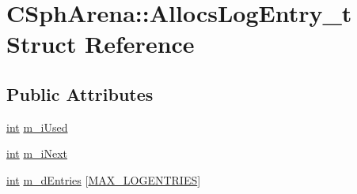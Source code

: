 \hypertarget{structCSphArena_1_1AllocsLogEntry__t}{\section{C\-Sph\-Arena\-:\-:Allocs\-Log\-Entry\-\_\-t Struct Reference}
\label{structCSphArena_1_1AllocsLogEntry__t}
}
\subsection*{Public Attributes}
\begin{DoxyCompactItemize}
\item 
\hyperlink{sphinxexpr_8cpp_a4a26e8f9cb8b736e0c4cbf4d16de985e}{int} \hyperlink{structCSphArena_1_1AllocsLogEntry__t_aa7105b091bb1f93bcb3375dc6d255044}{m\-\_\-i\-Used}
\item 
\hyperlink{sphinxexpr_8cpp_a4a26e8f9cb8b736e0c4cbf4d16de985e}{int} \hyperlink{structCSphArena_1_1AllocsLogEntry__t_a1e8b8b4b338d1313f70cb1ba8f83e96b}{m\-\_\-i\-Next}
\item 
\hyperlink{sphinxexpr_8cpp_a4a26e8f9cb8b736e0c4cbf4d16de985e}{int} \hyperlink{structCSphArena_1_1AllocsLogEntry__t_a0afb0c2d78e1453192d8d3f2f8a167a0}{m\-\_\-d\-Entries} \mbox{[}\hyperlink{classCSphArena_ad48b31ee600d8eacd91501079020d30f}{M\-A\-X\-\_\-\-L\-O\-G\-E\-N\-T\-R\-I\-E\-S}\mbox{]}
\end{DoxyCompactItemize}



